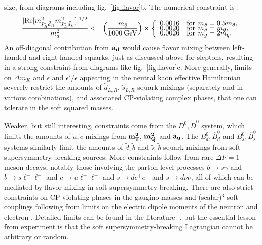 \documentclass[11pt]{article}
\def\beq{\begin{eqnarray}}
\def\eeq{\end{eqnarray}}
\def\sbar{\overline}
\def\stilde{\widetilde}
\begin{document}
size, from diagrams including fig.~\ref{fig:flavor}b. 
The numerical constraint is \cite{Ciuchini:1998ix}: 
\beq
\frac{|{\rm Re}[m^2_{\tilde s_R^* \tilde d_R}
m^2_{\tilde s_L^* \tilde d_L}]|^{1/2}}{
m^2_{\tilde q}}
&<&
\left ( \frac{m_{\tilde q}}{1000 \>{\rm GeV}} \right )
\times
\left \{ 
\begin{array}{ll}
0.0016 & {\rm for}\>\, m_{\tilde g} = 0.5 m_{\tilde q},
\\[-5pt]
0.0020 & {\rm for}\>\, m_{\tilde g} = m_{\tilde q},
\\[-5pt]
0.0026 & {\rm for}\>\, m_{\tilde g} = 2 m_{\tilde q}.
\end{array}
\right.
\label{eq:striking}
\eeq
An off-diagonal contribution from ${\bf a_d}$ would cause flavor mixing 
between left-handed and right-handed squarks, just as discussed above for 
sleptons, resulting in a strong constraint from diagrams like 
fig.~\ref{fig:flavor}c. More generally, limits on $\Delta m_K$ and 
$\epsilon$ and $\epsilon'/\epsilon$ appearing in the neutral kaon 
effective Hamiltonian severely restrict the amounts of $\stilde 
d_{L,R},\,\stilde s_{L,R}$ squark mixings (separately and in various 
combinations), and associated CP-violating complex phases, that one can 
tolerate in the soft squared masses.

Weaker, but still interesting, constraints come from the $D^0, \overline 
D^0$ system, which limits the amounts of $\stilde u,\stilde c$ mixings 
from ${\bf m_{\sbar u}^2}$, ${\bf m_Q^2}$ and ${\bf a_u}$. The $B_d^0, 
\overline B_d^0$ and $B_s^0, \overline B_s^0$ systems similarly limit the 
amounts of $\stilde d,\stilde b$ and $\stilde s,\stilde b$ squark mixings 
from soft supersymmetry-breaking sources.  More constraints follow from 
rare $\Delta F=1$ meson decays, notably those involving the parton-level 
processes $b\rightarrow s\gamma$ and $b \rightarrow s \ell^+ \ell^-$ and 
$c \rightarrow u \ell^+ \ell^-$ and $s \rightarrow d e^+ e^-$ and $s 
\rightarrow d \nu \bar \nu$, all of which can be mediated by flavor mixing 
in soft supersymmetry breaking. There are also strict constraints on 
CP-violating phases in the gaugino masses and (scalar)$^3$ soft couplings 
following from limits on the electric dipole moments of the neutron and 
electron \cite{demon}. Detailed limits can be found in the literature
\cite{FCNCs}-\cite{Ciuchini:2002uv}, 
but the essential lesson from experiment is that the soft 
supersymmetry-breaking Lagrangian cannot be arbitrary or random.
\end{document}
